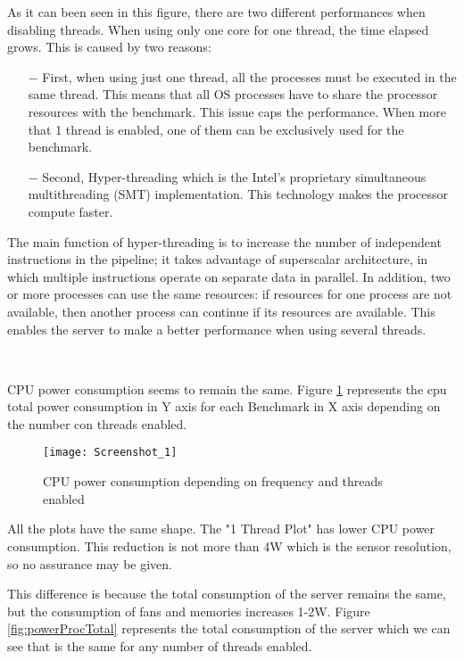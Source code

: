 As it can been seen in this figure, there are two different performances when disabling threads. When using only one core for one thread, the time elapsed grows. This is caused by two reasons: 

\begin{itemize}
\item [$-$] First, when using just one thread, all the processes must be executed in the same thread. This means that all OS processes have to share the processor resources with the benchmark. This issue caps the performance. When more that 1 thread is enabled, one of them can be exclusively used for the benchmark.

\item [$-$] Second, Hyper-threading which is the Intel's proprietary simultaneous multithreading (SMT) implementation. This technology makes the processor compute faster. 
\end{itemize}

The main function of hyper-threading is to increase the number of independent instructions in the pipeline; it takes advantage of superscalar architecture, in which multiple instructions operate on separate data in parallel. In addition, two or more processes can use the same resources: if resources for one process are not available, then another process can continue if its resources are available. This enables the server to make a better performance when using several threads.

\ 

CPU power consumption seems to remain the same. Figure \ref{fig:powerProc} represents the cpu total power consumption in Y axis for each Benchmark in X axis depending on the number con threads enabled. 

\begin{figure}[H]
\begin{center}
\texttt{[image: Screenshot\_1]} %
\caption{CPU power consumption depending on frequency and threads enabled}
\label{fig:powerProc} %
\end{center}
\end{figure}

All the plots have the same shape. The "1 Thread Plot" has lower CPU power consumption. This reduction is not more than 4W which is the sensor resolution, so no assurance may be given.

This difference is because the total consumption of the server remains the same, but the consumption of fans and memories increases 1-2W. Figure \ref{fig:powerProcTotal} represents the total consumption of the server which we can see that is the same for any number of threads enabled.

